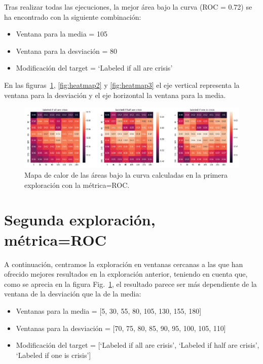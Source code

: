 \documentclass[a4paper,12pt,twoside,oldfontcommands]{memoir}
\begin{document}
Tras realizar todas las ejecuciones, la mejor área bajo la curva (ROC = 0.72) se ha encontrado con la siguiente combinación: 
\begin{itemize}
    \item Ventana para la media = 105
    \item Ventana para la desviación = 80
    \item Modificación del target = `Labeled if all are crisis'
\end{itemize}

En las figuras~\ref{fig:heatmap1}, \ref{fig:heatmap2} y \ref{fig:heatmap3} el eje vertical representa la ventana para la desviación y el eje horizontal la ventana para la media. 

\begin{figure}
    \centering
    \includegraphics[width=1\textwidth]{images/heatmap1.png}
    \caption{Mapa de calor de las áreas bajo la curva calculadas en la primera exploración con la métrica=ROC.}
    \label{fig:heatmap1}
\end{figure}

\section{Segunda exploración, métrica=ROC}

A continuación, centramos la exploración en ventanas cercanas a las que han ofrecido mejores resultados en la exploración anterior, teniendo en cuenta que, como se aprecia en la figura Fig.~\ref{fig:heatmap1}, el resultado parece ser más dependiente de la ventana de la desviación que la de la media: 
\begin{itemize}
    \item Ventanas para la media = [5, 30, 55, 80, 105, 130, 155, 180]
    \item Ventanas para la desviación = [70, 75, 80, 85, 90, 95, 100, 105, 110]
    \item Modificación del target = [`Labeled if all are crisis', `Labeled if half are crisis', `Labeled if one is crisis']
\end{itemize}
\end{document}
